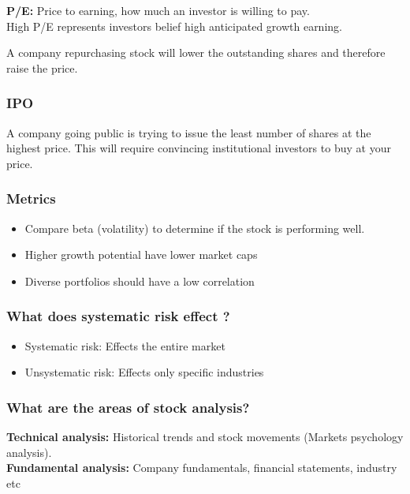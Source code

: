 \documentclass[11pt]{scrartcl} %
\begin{document}
\textbf{P/E:} Price to earning, how much an investor is willing to pay.\\

High P/E represents investors belief high anticipated growth earning.

A company repurchasing stock will lower the outstanding shares and therefore raise the price.

\subsubsection{IPO}

A company going public is trying to issue the least number of shares at the highest price. This will require convincing institutional investors to buy at your price.

\subsubsection{Metrics}

\begin{itemize}
	\item Compare beta (volatility) to determine if the stock is performing well.
	\item Higher growth potential have lower market caps
	\item Diverse portfolios should have a low correlation
\end{itemize}

\subsubsection{What does systematic risk effect ?}

\begin{itemize}
	\item Systematic risk: Effects the entire market 
	\item Unsystematic risk: Effects only specific industries
\end{itemize}

\subsubsection{What are the areas of stock analysis?}

\textbf{Technical analysis:} Historical trends and stock movements (Markets psychology analysis).\\
\textbf{Fundamental analysis:} Company fundamentals, financial statements, industry etc \\
\end{document}
